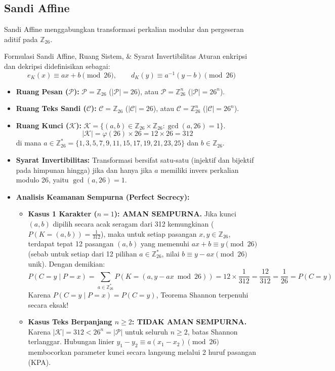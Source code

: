 \documentclass[11pt,a4paper]{article}
\begin{document}
\subsection{Sandi Affine}
Sandi Affine menggabungkan transformasi perkalian modular dan pergeseran aditif pada $\mathbb{Z}_{26}$.
\begin{thmbox}{Formulasi Sandi Affine, Ruang Sistem, \& Syarat Invertibilitas}
Aturan enkripsi dan dekripsi didefinisikan sebagai:
\[
e_K(x) \equiv ax + b \pmod{26}, \qquad d_K(y) \equiv a^{-1}(y - b) \pmod{26}
\]
\begin{itemize}[leftmargin=*]
    \item \textbf{Ruang Pesan ($\mathcal{P}$):} $\mathcal{P} = \mathbb{Z}_{26}$ ($|\mathcal{P}| = 26$), atau $\mathcal{P} = \mathbb{Z}_{26}^n$ ($|\mathcal{P}| = 26^n$).
    \item \textbf{Ruang Teks Sandi ($\mathcal{C}$):} $\mathcal{C} = \mathbb{Z}_{26}$ ($|\mathcal{C}| = 26$), atau $\mathcal{C} = \mathbb{Z}_{26}^n$ ($|\mathcal{C}| = 26^n$).
    \item \textbf{Ruang Kunci ($\mathcal{K}$):} $\mathcal{K} = \{(a, b) \in \mathbb{Z}_{26} \times \mathbb{Z}_{26} : \gcd(a, 26) = 1\}$.
    \[
    |\mathcal{K}| = \varphi(26) \times 26 = 12 \times 26 = 312
    \]
    di mana $a \in \mathbb{Z}_{26}^* = \{1, 3, 5, 7, 9, 11, 15, 17, 19, 21, 23, 25\}$ dan $b \in \mathbb{Z}_{26}$.
    \item \textbf{Syarat Invertibilitas:} Transformasi bersifat satu-satu (injektif dan bijektif pada himpunan hingga) jika dan hanya jika $a$ memiliki invers perkalian modulo 26, yaitu $\gcd(a, 26) = 1$.
    \item \textbf{Analisis Keamanan Sempurna (Perfect Secrecy):}
    \begin{itemize}
        \item \textbf{Kasus 1 Karakter ($n = 1$): AMAN SEMPURNA.} Jika kunci $(a, b)$ dipilih secara acak seragam dari 312 kemungkinan ($P(K = (a, b)) = \frac{1}{312}$), maka untuk setiap pasangan $x, y \in \mathbb{Z}_{26}$, terdapat tepat 12 pasangan $(a, b)$ yang memenuhi $ax + b \equiv y \pmod{26}$ (sebab untuk setiap dari 12 pilihan $a \in \mathbb{Z}_{26}^*$, nilai $b \equiv y - ax \pmod{26}$ unik). Dengan demikian:
        \[
        P(C = y \mid P = x) = \sum_{a \in \mathbb{Z}_{26}^*} P(K = (a, y - ax \bmod 26)) = 12 \times \frac{1}{312} = \frac{12}{312} = \frac{1}{26} = P(C = y)
        \]
        Karena $P(C = y \mid P = x) = P(C = y)$, Teorema Shannon terpenuhi secara eksak!
        \item \textbf{Kasus Teks Berpanjang $n \ge 2$: TIDAK AMAN SEMPURNA.} Karena $|\mathcal{K}| = 312 < 26^n = |\mathcal{P}|$ untuk seluruh $n \ge 2$, batas Shannon terlanggar. Hubungan linier $y_1 - y_2 \equiv a(x_1 - x_2) \pmod{26}$ membocorkan parameter kunci secara langsung melalui 2 huruf pasangan (KPA).
    \end{itemize}
\end{itemize}
\end{thmbox}
\end{document}
